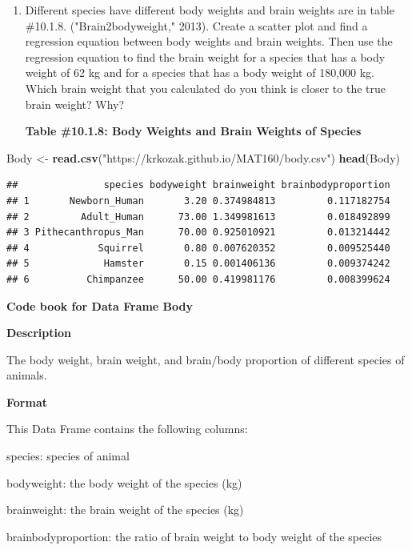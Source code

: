 \documentclass[
]{book}
\newenvironment{Shaded}{\begin{snugshade}}{\end{snugshade}}
\newcommand{\KeywordTok}[1]{\textcolor[rgb]{0.13,0.29,0.53}{\textbf{#1}}}
\newcommand{\NormalTok}[1]{#1}
\newcommand{\StringTok}[1]{\textcolor[rgb]{0.31,0.60,0.02}{#1}}
\begin{document}
\begin{enumerate}
\def\labelenumi{\arabic{enumi}.}
\setcounter{enumi}{5}
\item
  Different species have different body weights and brain weights are in table \#10.1.8. ("Brain2bodyweight," 2013). Create a scatter plot and find a regression equation between body weights and brain weights. Then use the regression equation to find the brain weight for a species that has a body weight of 62 kg and for a species that has a body weight of 180,000 kg. Which brain weight that you calculated do you think is closer to the true brain weight? Why?

  \textbf{Table \#10.1.8: Body Weights and Brain Weights of Species}
\end{enumerate}

\begin{Shaded}
\begin{Highlighting}[]
\NormalTok{Body <-}\StringTok{ }\KeywordTok{read.csv}\NormalTok{(}\StringTok{"https://krkozak.github.io/MAT160/body.csv"}\NormalTok{)}
\KeywordTok{head}\NormalTok{(Body)}
\end{Highlighting}
\end{Shaded}

\begin{verbatim}
##               species bodyweight brainweight brainbodyproportion
## 1       Newborn_Human       3.20 0.374984813         0.117182754
## 2         Adult_Human      73.00 1.349981613         0.018492899
## 3 Pithecanthropus_Man      70.00 0.925010921         0.013214442
## 4            Squirrel       0.80 0.007620352         0.009525440
## 5             Hamster       0.15 0.001406136         0.009374242
## 6          Chimpanzee      50.00 0.419981176         0.008399624
\end{verbatim}

\textbf{Code book for Data Frame Body}

\textbf{Description}

The body weight, brain weight, and brain/body proportion of different species of animals.

\textbf{Format}

This Data Frame contains the following columns:

species: species of animal

bodyweight: the body weight of the species (kg)

brainweight: the brain weight of the species (kg)

brainbodyproportion: the ratio of brain weight to body weight of the species
\end{document}
